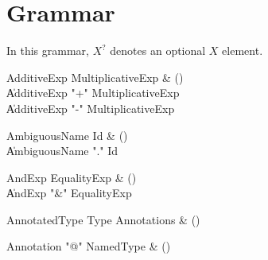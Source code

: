 \chapter{Grammar}\label{Grammar}


In this grammar, $X^?$ denotes an optional $X$ element.


\begin{bbgrammar}

AdditiveExp \label{prod:AdditiveExp}  \: MultiplicativeExp & () \\

    \| AdditiveExp \xcd"+" MultiplicativeExp \\
    \| AdditiveExp \xcd"-" MultiplicativeExp \\

\end{bbgrammar}

\begin{bbgrammar}

AmbiguousName \label{prod:AmbiguousName}  \: Id & () \\

    \| AmbiguousName \xcd"." Id \\

\end{bbgrammar}

\begin{bbgrammar}

AndExp \label{prod:AndExp}  \: EqualityExp & () \\

    \| AndExp \xcd"&" EqualityExp \\

\end{bbgrammar}

\begin{bbgrammar}

AnnotatedType \label{prod:AnnotatedType}  \: Type Annotations & () \\


\end{bbgrammar}

\begin{bbgrammar}

Annotation \label{prod:Annotation}  \: \xcd"@" NamedType & () \\


\end{bbgrammar}

